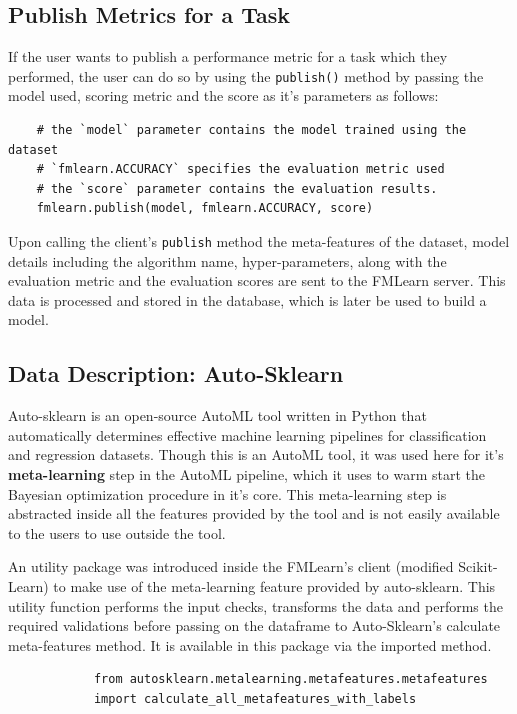 \subsection*{Publish Metrics for a Task}

If the user wants to publish a performance metric for a task which they performed, the user can do so by using the \texttt{publish()} method by passing the model used, scoring metric and the score as it's parameters as follows:

\begin{lstlisting}
    # the `model` parameter contains the model trained using the dataset
    # `fmlearn.ACCURACY` specifies the evaluation metric used
    # the `score` parameter contains the evaluation results.
    fmlearn.publish(model, fmlearn.ACCURACY, score)
\end{lstlisting}

Upon calling the client's \texttt{publish} method the meta-features of the dataset, model details including the algorithm name, hyper-parameters, along with the evaluation metric and the evaluation scores are sent to the FMLearn server. This data is processed and stored in the database, which is later be used to build a model.

\subsection{Data Description: Auto-Sklearn}
\label{auto-sklearn}

Auto-sklearn \citep{feurer:m} is an open-source AutoML tool written in Python that automatically determines effective machine learning pipelines for classification and regression datasets. Though this is an AutoML tool, it was used here for it's \textbf{meta-learning} step in the AutoML pipeline, which it uses to warm start the Bayesian optimization procedure in it's core. This meta-learning step is abstracted inside all the features provided by the tool and is not easily available to the users to use outside the tool.

An utility package was introduced inside the FMLearn's client (modified Scikit-Learn) to make use of the meta-learning feature provided by auto-sklearn. This utility function performs the input checks, transforms the data and performs the required validations before passing on the dataframe to Auto-Sklearn's calculate meta-features method. It is available in this package via the imported method.

\begin{lstlisting}
            from autosklearn.metalearning.metafeatures.metafeatures 
            import calculate_all_metafeatures_with_labels
\end{lstlisting}

